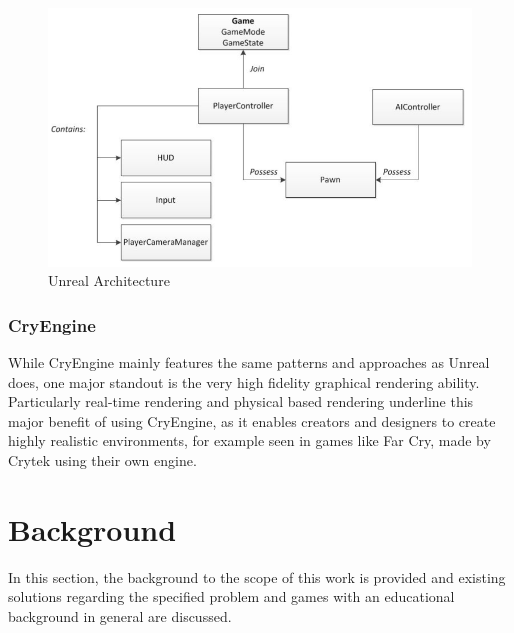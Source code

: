 \begin{figure}
    \centering
    \includegraphics[width=\textwidth]{Pictures/res/fundamentals/unreal-framework}
    \caption{Unreal Architecture~\cite{UNREAL:Framework}}
    \label{fig:unreal-concept}
\end{figure}
\subsubsection{CryEngine}\label{subsubsec:cryengine}
While CryEngine mainly features the same patterns and approaches as Unreal does, one major standout is the very high fidelity graphical rendering
ability.
Particularly real-time rendering and physical based rendering underline this major benefit of using CryEngine, as it enables
creators and designers to create highly realistic environments, for example seen in games like Far Cry, made by Crytek using their own
engine.


\section{Background}\label{sec:background}
In this section, the background to the scope of this work is provided and existing solutions regarding the specified problem and
games with an educational background in general are discussed.
